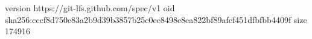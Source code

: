 version https://git-lfs.github.com/spec/v1
oid sha256:cccf8d750e83a2b9d39b3857b25c0ee8498e8ea822bf89afcf451dfbfbb4409f
size 174916

